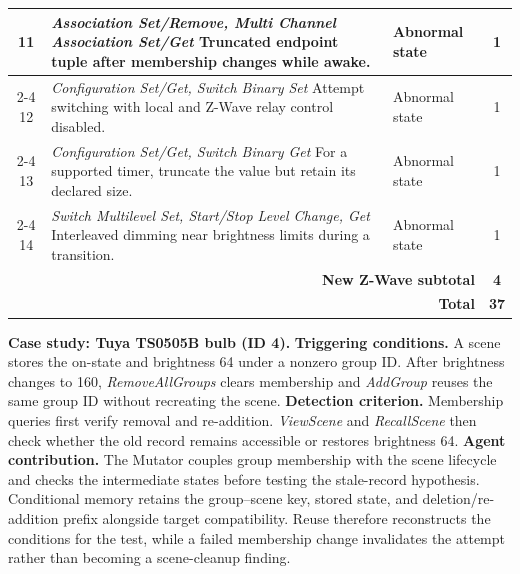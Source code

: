 \documentclass[10pt,journal,compsoc]{IEEEtran}
\newcommand{\parab}[1]{\vspace{0.04in}\noindent\textbf{#1}}
\begin{document}
\begin{table}[!t]
\begin{tabularx}{\columnwidth}{@{}c >{\raggedright\arraybackslash}X >{\centering\arraybackslash}p{} c@{}}
\midrule
11 & \emph{Association Set/Remove, Multi Channel Association Set/Get}\newline
     Truncated endpoint tuple after membership changes while awake.
   & Abnormal state & 1 \\
\cmidrule(lr){2-4}
12 & \emph{Configuration Set/Get, Switch Binary Set}\newline
     Attempt switching with local and Z-Wave relay control disabled.
   & Abnormal state & 1\\
\cmidrule(lr){2-4}
13 & \emph{Configuration Set/Get, Switch Binary Get}\newline
     For a supported timer, truncate the value but retain its declared size.
   & Abnormal state & 1\\
\cmidrule(lr){2-4}
14 & \emph{Switch Multilevel Set, Start/Stop Level Change, Get}\newline
     Interleaved dimming near brightness limits during a transition.
   & Abnormal state & 1 \\
\midrule
\multicolumn{3}{r}{\textbf{New Z-Wave subtotal}} & \textbf{4} \\
\midrule
\multicolumn{3}{r}{\textbf{Total}} & \textbf{37} \\
\bottomrule
\end{tabularx}
\end{table}

\parab{Case study: Tuya TS0505B bulb (ID 4).}
\textbf{Triggering conditions.} A scene stores the on-state and brightness 64 under a nonzero group ID. After brightness changes to 160, \emph{RemoveAllGroups} clears membership and \emph{AddGroup} reuses the same group ID without recreating the scene. \textbf{Detection criterion.} Membership queries first verify removal and re-addition. \emph{ViewScene} and \emph{RecallScene} then check whether the old record remains accessible or restores brightness 64. \textbf{Agent contribution.} The Mutator couples group membership with the scene lifecycle and checks the intermediate states before testing the stale-record hypothesis. Conditional memory retains the group--scene key, stored state, and deletion/re-addition prefix alongside target compatibility. Reuse therefore reconstructs the conditions for the test, while a failed membership change invalidates the attempt rather than becoming a scene-cleanup finding.
\end{document}
